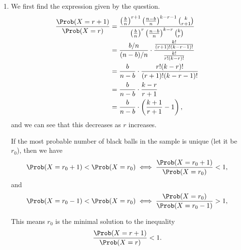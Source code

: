 \Question{\currfilebase}

\begin{enumerate}
    \item We first find the expression given by the question.
          \begin{align*}
              \frac{\Prob(X = r + 1)}{\Prob(X = r)} & = \frac{\left(\frac{b}{n}\right)^{r + 1} \left(\frac{n - b}{n}\right)^{k - r - 1} \binom{k}{r + 1}}{\left(\frac{b}{n}\right)^{r} \left(\frac{n - b}{n}\right)^{k - r} \binom{k}{r}} \\
                                                    & = \frac{b / n}{(n - b) / n} \cdot \frac{\frac{k!}{(r + 1)! (k - r - 1)!}}{\frac{k!}{r! (k - r)!}}                                                                                   \\
                                                    & = \frac{b}{n - b} \cdot \frac{r! (k - r)!}{(r + 1)! (k - r - 1)!}                                                                                                                   \\
                                                    & = \frac{b}{n - b} \cdot \frac{k - r}{r + 1}                                                                                                                                         \\
                                                    & = \frac{b}{n - b} \cdot \left(\frac{k + 1}{r + 1} - 1\right),
          \end{align*}
          and we can see that this decreases as \(r\) increases.

          If the most probable number of black balls in the sample is unique (let it be \(r_0\)), then we have
          \[
              \Prob(X = r_0 + 1) < \Prob(X = r_0) \iff \frac{\Prob(X = r_0 + 1)}{\Prob(X = r_0)} < 1,
          \]
          and
          \[
              \Prob(X = r_0 - 1) < \Prob(X = r_0) \iff \frac{\Prob(X = r_0)}{\Prob(X = r_0 - 1)} > 1,
          \]

          This means \(r_0\) is the minimal solution to the inequality
          \[
              \frac{\Prob(X = r + 1)}{\Prob(X = r)} < 1.
          \]


\end{enumerate}

